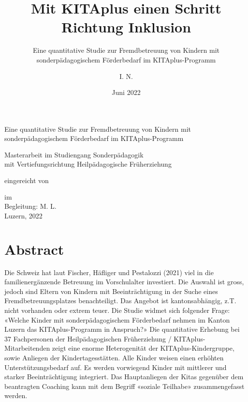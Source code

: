 \documentclass[
  ngerman,
  11pt,
  paper=a4,
  twoside,
  titlepage=true,
  openright,
  abstract=on,
  toc=listofnumbered,
  numbers=noenddot,
  chapterprefix=true,
  headings=optiontohead,
  svgnames,
  dvipsnames]{scrreprt}
\title{Mit KITAplus einen Schritt Richtung Inklusion}
\subtitle{Eine quantitative Studie zur Fremdbetreuung von Kindern mit
sonderpädagogischem Förderbedarf im KITAplus-Programm}
\author{I. N.}
\date{Juni 2022}
\begin{document}
%
%
\begin{titlepage}
\makeatletter
\vphantom{A}\vspace{0.5cm}
\begin{center}

\end{center}
\vspace{2cm}
\begin{center}
\fontsize{22pt}{24pt}\selectfont\textbf{\@title}
\end{center}
\begin{center}
\fontsize{16pt}{18pt}\selectfont
Eine quantitative Studie zur Fremdbetreuung von Kindern mit
sonderpädagogischem Förderbedarf im KITAplus-Programm\\
\end{center}
\begin{center}
Masterarbeit im Studiengang Sonderpädagogik\\ mit Vertiefungsrichtung
Heilpädagogische Früherziehung
\end{center}
\begin{center}
eingereicht von
\end{center}
\begin{center}
\textbf{\@author}
\end{center}
\begin{center}
im \@date\\
\vspace{0.5cm}
Begleitung: M. L.\\
\vfill
Luzern, 2022
\end{center}
\makeatother
\end{titlepage}%
\cleardoublepage
{}
\pagestyle{scrheadings}
\setcounter{page}{1}
%
\newcommand{\abstracttitle}{Abstract}
\chapter*{\abstracttitle}
\thispagestyle{plain}
Die Schweiz hat laut Fischer, Häfliger und Pestalozzi (2021) viel in die
familienergänzende Betreuung im Vorschulalter investiert. Die Auswahl
ist gross, jedoch sind Eltern von Kindern mit Beeinträchtigung in der
Suche eines Fremdbetreuungsplatzes benachteiligt. Das Angebot ist
kantonsabhängig, z.T. nicht vorhanden oder extrem teuer. Die Studie
widmet sich folgender Frage: «Welche Kinder mit sonderpädagogischem
Förderbedarf nehmen im Kanton Luzern das KITAplus-Programm in Anspruch?»
Die quantitative Erhebung bei 37 Fachpersonen der Heilpädagogischen
Früherziehung / KITAplus-Mitarbeitenden zeigt eine enorme Heterogenität
der KITAplus-Kindergruppe, sowie Anliegen der Kindertagesstätten. Alle
Kinder weisen einen erhöhten Unterstützungsbedarf auf. Es werden
vorwiegend Kinder mit mittlerer und starker Beeinträchtigung integriert.
Das Hauptanliegen der Kitas gegenüber dem beantragten Coaching kann mit
dem Begriff «soziale Teilhabe» zusammengefasst werden.
\cleardoublepage%
\newcommand{\acknowledgementtitle}{Danksagung}
\thispagestyle{plain}
\end{document}
